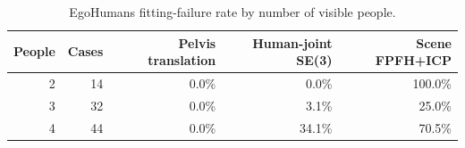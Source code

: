 \begin{table}[t]
  \centering
  \caption{EgoHumans fitting-failure rate by number of visible people.}
  \label{tab:supp-registration-person-count}
  \supptablesize
  \setlength{\tabcolsep}{3.5pt}
  \begin{tabular}{rrrrr}
    \toprule
    People & Cases & Pelvis translation & Human-joint SE(3) & Scene FPFH+ICP \\
    \midrule
    2 & 14 & 0.0\% & 0.0\% & 100.0\% \\
    3 & 32 & 0.0\% & 3.1\% & 25.0\% \\
    4 & 44 & 0.0\% & 34.1\% & 70.5\% \\
    \bottomrule
  \end{tabular}
\end{table}
